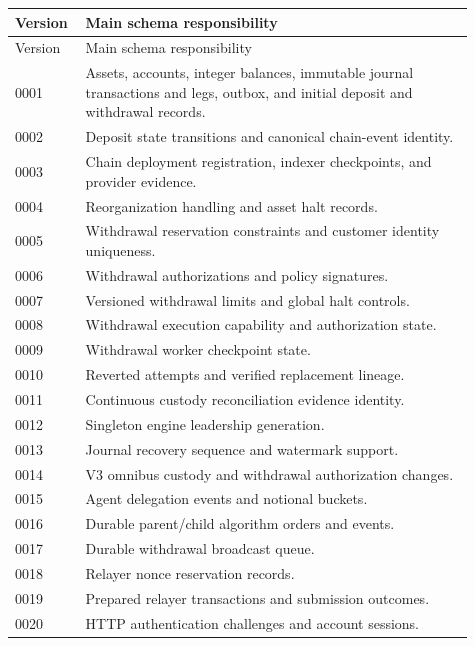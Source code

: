 \documentclass[envcountsame,runningheads,notitlepage]{llncs}
\begin{document}
\begin{longtable}{p{0.12\linewidth}p{0.79\linewidth}}
\toprule
Version & Main schema responsibility \\
\midrule\endfirsthead
\toprule Version & Main schema responsibility \\
\midrule\endhead
0001 & Assets, accounts, integer balances, immutable journal transactions and legs, outbox, and initial deposit and withdrawal records. \\
0002 & Deposit state transitions and canonical chain-event identity. \\
0003 & Chain deployment registration, indexer checkpoints, and provider evidence. \\
0004 & Reorganization handling and asset halt records. \\
0005 & Withdrawal reservation constraints and customer identity uniqueness. \\
0006 & Withdrawal authorizations and policy signatures. \\
0007 & Versioned withdrawal limits and global halt controls. \\
0008 & Withdrawal execution capability and authorization state. \\
0009 & Withdrawal worker checkpoint state. \\
0010 & Reverted attempts and verified replacement lineage. \\
0011 & Continuous custody reconciliation evidence identity. \\
0012 & Singleton engine leadership generation. \\
0013 & Journal recovery sequence and watermark support. \\
0014 & V3 omnibus custody and withdrawal authorization changes. \\
0015 & Agent delegation events and notional buckets. \\
0016 & Durable parent/child algorithm orders and events. \\
0017 & Durable withdrawal broadcast queue. \\
0018 & Relayer nonce reservation records. \\
0019 & Prepared relayer transactions and submission outcomes. \\
0020 & HTTP authentication challenges and account sessions. \\
\bottomrule
\end{longtable}
\normalsize
\end{document}
